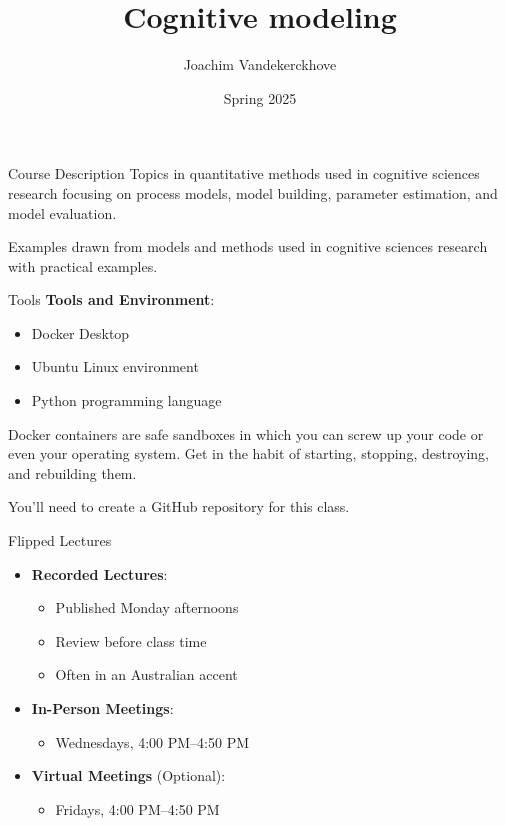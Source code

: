 \documentclass[aspectratio=169]{beamer}
\title{Cognitive modeling}
\author{Joachim Vandekerckhove}
\date{Spring 2025}
\begin{document}
\maketitle
\begin{frame}{Course Description}
Topics in quantitative methods used in cognitive sciences research focusing on process models, model building, parameter estimation, and model evaluation. 

Examples drawn from models and methods used in cognitive sciences research with practical examples.
\end{frame}

\begin{frame}{Tools}
\textbf{Tools and Environment}:
\begin{itemize}[<+->]
    \item Docker Desktop
    \item Ubuntu Linux environment
    \item Python programming language
\end{itemize}\pause
Docker containers are safe sandboxes in which you can screw up your code or even your operating system.  Get in the habit of starting, stopping, destroying, and rebuilding them.\pause

You'll need to create a GitHub repository for this class.
\end{frame}


\begin{frame}{Flipped Lectures}
\begin{itemize}[<+->]
\item[]
\textbf{Recorded Lectures}:
\begin{itemize}
    \item Published Monday afternoons
    \item Review before class time
    \item Often in an Australian accent
\end{itemize}
\item[]
\textbf{In-Person Meetings}:
\begin{itemize}
    \item Wednesdays, 4:00 PM--4:50 PM
\end{itemize}
\item[]
\textbf{Virtual Meetings} (Optional):
\begin{itemize}
    \item Fridays, 4:00 PM--4:50 PM
\end{itemize}
\end{itemize}
\end{frame}
\end{document}
